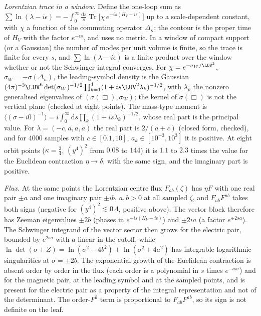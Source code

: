 \emph{Lorentzian trace in a window.} Define the one-loop sum as \(\sum\ln(\lambda-i\epsilon)=-\int_0^\infty\frac{\mathrm ds}{s}\operatorname{Tr}\bigl[\chi\,e^{-is(H_V-i\epsilon)}\bigr]\) up to a scale-dependent constant, with \(\chi\) a function of the commuting operator \(\Delta_\kappa\); the contour is the proper time of \(H_V\) with the factor \(e^{-\epsilon s}\), and uses no metric. In a window of compact support (or a Gaussian) the number of modes per unit volume is finite, so the trace is finite for every \(s\), and \(\sum\ln(\lambda-i\epsilon)\) is a finite product over the window whether or not the Schwinger integral converges. For \(\chi=e^{-\sigma_W/\LUV^2}\), \(\sigma_W=-\sigma(\Delta_\kappa)\), the leading-symbol density is the Gaussian \((4\pi)^{-3}\LUV^6\det(\sigma_W)^{-1/2}\prod_{k=1}^{4}(1+is\LUV^2\lambda_k)^{-1/2}\), with \(\lambda_k\) the nonzero generalised eigenvalues of \((\sigma(\Box),\sigma_W)\); the kernel of \(\sigma(\Box)\) is not the vertical plane (checked at eight points). The mass-type moment is \(\langle(\sigma-i0)^{-1}\rangle=i\int_0^\infty\mathrm ds\prod_k(1+is\lambda_k)^{-1/2}\), whose real part is the principal value. For \(\lambda=(-c,a,a,a)\) the real part is \(2/(a+c)\) (closed form, checked), and for \(4000\) samples with \(c\in[0.1,10]\), \(a_k\in[10^{-3},10^{3}]\) it is positive. At eight orbit points (\(\kappa=\tfrac34\), \((y^4)^2\) from \(0.08\) to \(144\)) it is \(1.1\) to \(2.3\) times the value for the Euclidean contraction \(\eta\to\delta\), with the same sign, and the imaginary part is positive.



\emph{Flux.} At the same points the Lorentzian centre flux \(F_{ab}(\zeta)\) has \(\eta F\) with one real pair \(\pm a\) and one imaginary pair \(\pm ib\), \(a,b>0\) at all sampled \(\zeta\), and \(F_{ab}F^{ab}\) takes both signs (negative for \((y^4)^2\lesssim0.4\), positive above). The vector block therefore has Zeeman eigenvalues \(\pm2b\) (phases in \(e^{-is(H_V-i\epsilon)}\)) and \(\pm2ia\) (a factor \(e^{\pm2sa}\)). The Schwinger integrand of the vector sector then grows for the electric pair, bounded by \(e^{2sa}\) with \(a\) linear in the cutoff, while \(\ln\det(\sigma+Z)=\ln(\sigma^2-4b^2)+\ln(\sigma^2+4a^2)\) has integrable logarithmic singularities at \(\sigma=\pm2b\). The exponential growth of the Euclidean contraction is absent order by order in the flux (each order is a polynomial in \(s\) times \(e^{-is\sigma}\)) and for the magnetic pair, at the leading symbol and at the sampled points, and is present for the electric pair as a property of the integral representation and not of the determinant. The order-\(F^2\) term is proportional to \(F_{ab}F^{ab}\), so its sign is not definite on the leaf.



